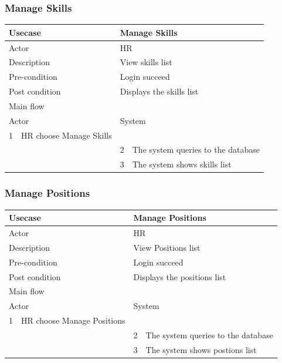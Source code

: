 \documentclass[a4paper]{article}
\begin{document}
\subsubsection{Manage Skills}
\begin{tabular}{|l|p{5cm}||l|p{5cm}|}
	\hline 
	\multicolumn{2}{|p{5cm}|}{Usecase} & \multicolumn{2}{|p{5cm}|}{Manage Skills}\\ 
	\hline 
	\multicolumn{2}{|p{5cm}|}{Actor} & \multicolumn{2}{|p{5cm}|}{HR} \\ 
	\hline 
	\multicolumn{2}{|p{5cm}|}{Description} & \multicolumn{2}{|p{5cm}|}{View skills list}\\
	\hline
	\multicolumn{2}{|p{5cm}|}{Pre-condition} & \multicolumn{2}{|p{5cm}|}{Login succeed}\\
	\hline
	\multicolumn{2}{|p{5cm}|}{Post condition} & \multicolumn{2}{|p{5cm}|}{Displays the skills list} \\
	\hline
	\multicolumn{4}{|l|}{Main flow} \\
	\hline
	\multicolumn{2}{|p{5cm}|}{Actor} & \multicolumn{2}{|p{5cm}|}{System} \\
	\hline
	1 & HR choose Manage Skills & & \\
	\hline
	& & 2 & The system queries to the database \\
	\hline 
	& & 3 & The system shows skills list  \\
	\hline
\end{tabular}

\subsubsection{Manage Positions}
\begin{tabular}{|l|p{5cm}||l|p{5cm}|}
	\hline 
	\multicolumn{2}{|p{5cm}|}{Usecase} & \multicolumn{2}{|p{5cm}|}{Manage Positions}\\ 
	\hline 
	\multicolumn{2}{|p{5cm}|}{Actor} & \multicolumn{2}{|p{5cm}|}{HR} \\ 
	\hline 
	\multicolumn{2}{|p{5cm}|}{Description} & \multicolumn{2}{|p{5cm}|}{View Positions list}\\
	\hline
	\multicolumn{2}{|p{5cm}|}{Pre-condition} & \multicolumn{2}{|p{5cm}|}{Login succeed}\\
	\hline
	\multicolumn{2}{|p{5cm}|}{Post condition} & \multicolumn{2}{|p{5cm}|}{Displays the positions list} \\
	\hline
	\multicolumn{4}{|l|}{Main flow} \\
	\hline
	\multicolumn{2}{|p{5cm}|}{Actor} & \multicolumn{2}{|p{5cm}|}{System} \\
	\hline
	1 & HR choose Manage Positions & & \\
	\hline
	& & 2 & The system queries to the database \\
	\hline 
	& & 3 & The system shows postions list  \\
	\hline
\end{tabular}
\end{document}
